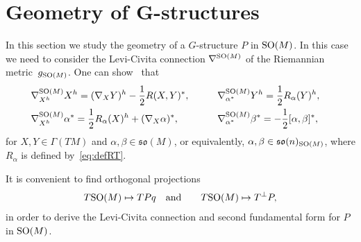 \documentclass[pdftex]{sigma}
\numberwithin{equation}{section}
\begin{document}
\section[Geometry of $G$-structures]{Geometry of $\boldsymbol{G}$-structures}\label{section5}

In this section we study the geometry of a $G$-structure $P$ in ${\rm SO}(M)$. In this case we need to consider the Levi-Civita connection $\nabla^{{\rm SO}(M)}$ of the Riemannian metric~$g_{{\rm SO}(M)}$. One can show~\cite{kn} that
\begin{alignat*}{3}
& \nabla^{{\rm SO}(M)}_{X^h}X^h =(\nabla_XY)^h-\frac{1}{2}R(X,Y)^{\ast},\qquad && \nabla^{{\rm SO}(M)}_{\alpha^{\ast}}Y^h =\frac{1}{2}R_{\alpha}(Y)^h,&\\
& \nabla^{{\rm SO}(M)}_{X^h}\alpha^{\ast} =\frac{1}{2}R_{\alpha}(X)^h+(\nabla_X\alpha)^{\ast},\qquad &&
\nabla^{{\rm SO}(M)}_{\alpha^{\ast}}\beta^{\ast} =-\frac{1}{2}[\alpha,\beta]^{\ast},&
\end{alignat*}
for $X,Y\in \Gamma(TM)$ and $\alpha,\beta\in\mathfrak{so}(M)$, or equivalently, $\alpha,\beta\in \mathfrak{so}(n)_{{\rm SO}(M)}$, where $R_{\alpha}$ is def\/ined by~\eqref{eq:defRT}.

It is convenient to f\/ind orthogonal projections
\begin{gather*}
T{\rm SO}(M)\mapsto TPq\quad\textrm{and}\qquad T{\rm SO}(M)\mapsto T^{\bot}P,
\end{gather*}
in order to derive the Levi-Civita connection and second fundamental form for $P$ in ${\rm SO}(M)$.
\end{document}
